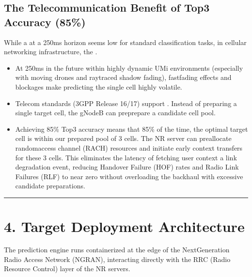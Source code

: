 \documentclass[letterpaper,10pt,english]{sphinxmanual}
\begin{document}
\subsection{The Telecommunication Benefit of Top\sphinxhyphen{}3 Accuracy (85\%)}
\label{\detokenize{deployement:the-telecommunication-benefit-of-top-3-accuracy-85}}
\sphinxAtStartPar
While a  at a 250ms horizon seems low for standard classification tasks, in cellular networking infrastructure, the .
\begin{itemize}
\item {} 
\sphinxAtStartPar
{} At 250ms in the future within highly dynamic UMi environments (especially with moving drones and ray\sphinxhyphen{}traced shadow fading), fast\sphinxhyphen{}fading effects and blockages make predicting the  single cell highly volatile.

\item {} 
\sphinxAtStartPar
{} Telecom standards (3GPP Release 16/17) support . Instead of preparing a single target cell, the gNodeB can pre\sphinxhyphen{}prepare a candidate cell pool.

\item {} 
\sphinxAtStartPar
{} Achieving 85\% Top\sphinxhyphen{}3 accuracy means that 85\% of the time, the optimal target cell is within our prepared pool of 3 cells. The NR server can pre\sphinxhyphen{}allocate random\sphinxhyphen{}access channel (RACH) resources and initiate early context transfers for these 3 cells. This eliminates the latency of fetching user context  a link degradation event, reducing Handover Failure (HOF) rates and Radio Link Failures (RLF) to near zero without overloading the backhaul with excessive candidate preparations.

\end{itemize}


\bigskip\hrule\bigskip



\section{4. Target Deployment Architecture}
\label{\detokenize{deployement:target-deployment-architecture}}
\sphinxAtStartPar
The prediction engine runs containerized at the edge of the Next\sphinxhyphen{}Generation Radio Access Network (NG\sphinxhyphen{}RAN), interacting directly with the RRC (Radio Resource Control) layer of the NR servers.
\end{document}
